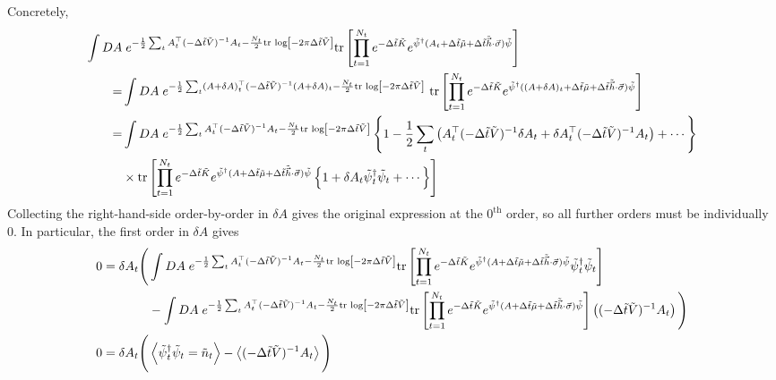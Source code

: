 Concretely,
\begin{align}
	\int DA&\; e^{-\frac{1}{2} \sum_t A{}^{\top}_t (-\Delta\tilde{t} \tilde{V})^{-1} A_t - \frac{N_t}{2} \text{tr log}\left[-2\pi \Delta\tilde{t}\tilde{V}\right]}
		\text{tr}\left[\prod_{t=1}^{N_t} e^{-\Delta \tilde{t}\tilde{K}}  e^{ \tilde{\psi}{}^{\dagger} (A_t + \Delta\tilde{t} \tilde{\mu} + \Delta\tilde{t} \tilde{\vec{h}}\cdot\vec{\sigma})\tilde{\psi}} \right] 
	\nonumber\\
	=&
	\int DA\; e^{-\frac{1}{2} \sum_t (A+\delta A){}^{\top}_t (-\Delta\tilde{t} \tilde{V})^{-1} (A+\delta A)_t - \frac{N_t}{2} \text{tr log}\left[-2\pi \Delta\tilde{t}\tilde{V}\right]}
	~	\text{tr}\left[\prod_{t=1}^{N_t} e^{-\Delta \tilde{t}\tilde{K}}  e^{ \tilde{\psi}{}^{\dagger} ((A+\delta A)_t + \Delta\tilde{t} \tilde{\mu} + \Delta\tilde{t} \tilde{\vec{h}}\cdot\vec{\sigma})\tilde{\psi}} \right] 
	\nonumber\\
	=&
	\int DA\; e^{-\frac{1}{2} \sum_t A{}^{\top}_t (-\Delta\tilde{t} \tilde{V})^{-1} A_t - \frac{N_t}{2}\text{tr log}\left[-2\pi \Delta\tilde{t}\tilde{V}\right]}
		\left\{1 - \frac{1}{2} \sum_t \left(A{}^{\top}_t (-\Delta\tilde{t}\tilde{V})^{-1} \delta A_t + \delta A{}^{\top}_t (-\Delta\tilde{t}\tilde{V})^{-1} A_t\right) +\cdots\right\} 
	\nonumber\\
	&\times\text{tr}\left[\prod_{t=1}^{N_t} e^{-\Delta \tilde{t}\tilde{K}}  e^{ \tilde{\psi}{}^{\dagger} (A + \Delta\tilde{t} \tilde{\mu} + \Delta\tilde{t} \tilde{\vec{h}}\cdot\vec{\sigma})\tilde{\psi}} \left\{1 + \delta A_t \tilde{\psi}{}^{\dagger}_t \tilde{\psi}_t + \cdots\right\} \right] 
\end{align}
Collecting the right-hand-side order-by-order in $\delta A$ gives the original expression at the $0^\text{th}$ order, so all further orders must be individually 0.
In particular, the first order in $\delta A$ gives
\begin{align}
	0 =
	\delta A_t \Bigg(&
		\int DA\; e^{-\frac{1}{2} \sum_t A{}^{\top}_t (-\Delta\tilde{t} \tilde{V})^{-1} A_t - \frac{N_t}{2}\text{tr log}\left[-2\pi \Delta\tilde{t}\tilde{V}\right]}
		\text{tr}\left[\prod_{t=1}^{N_t} e^{-\Delta \tilde{t}\tilde{K}}  e^{ \tilde{\psi}{}^{\dagger} (A + \Delta\tilde{t} \tilde{\mu} + \Delta\tilde{t} \tilde{\vec{h}}\cdot\vec{\sigma})\tilde{\psi}} \tilde{\psi}{}^{\dagger}_t \tilde{\psi}_t \right]
	\nonumber\\
	&
	-	\int DA\; e^{-\frac{1}{2} \sum_t A{}^{\top}_t (-\Delta\tilde{t} \tilde{V})^{-1} A_t - \frac{N_t}{2}\text{tr log}\left[-2\pi \Delta\tilde{t}\tilde{V}\right]}
		\text{tr}\left[\prod_{t=1}^{N_t} e^{-\Delta \tilde{t}\tilde{K}}  e^{ \tilde{\psi}{}^{\dagger} (A + \Delta\tilde{t} \tilde{\mu} + \Delta\tilde{t} \tilde{\vec{h}}\cdot\vec{\sigma})\tilde{\psi}} \right] \left((-\Delta\tilde{t}\tilde{V})^{-1} A_t\right)
	\Bigg) 
	\nonumber\\
	0 = \delta A_t \Bigg(& \left\langle \tilde{\psi}{}^{\dagger}_t\tilde{\psi}_t = \tilde{n}_t \right\rangle - \left\langle  (-\Delta\tilde{t}\tilde{V})^{-1} A_t \right\rangle \Bigg)
\end{align}

